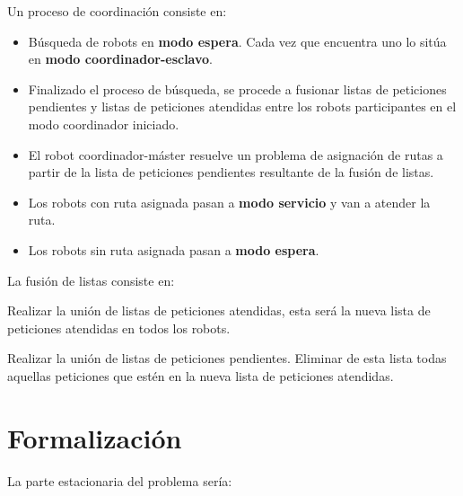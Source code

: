 \documentclass[preprint,12pt]{elsarticle}
\begin{document}
\begin{itemize}
\item{Un proceso de coordinación consiste en:
\begin{itemize}
\item{Búsqueda de robots en \textbf{modo espera}. Cada vez que encuentra uno lo sitúa en \textbf{modo coordinador-esclavo}. }
\item{Finalizado el proceso de búsqueda, se procede a fusionar listas de peticiones pendientes y listas de peticiones atendidas entre los robots participantes en el modo coordinador iniciado.}
\item{El robot coordinador-máster resuelve un problema de asignación de rutas a partir de la lista de peticiones pendientes resultante de la fusión de listas.}
\item{Los robots con ruta asignada pasan a \textbf{modo servicio} y van a atender la ruta.}
\item{Los robots sin ruta asignada pasan a \textbf{modo espera}.}
\end{itemize}
}

\item{La fusión de listas consiste en:

\item Realizar la unión de listas de peticiones atendidas, esta será la nueva lista de peticiones atendidas en todos los robots.
\item Realizar la unión de listas de peticiones pendientes. Eliminar de esta lista todas aquellas peticiones que estén en la nueva lista de peticiones atendidas.

} 

\end{itemize}

\section{Formalización}

La parte estacionaria del problema sería:
\end{document}
